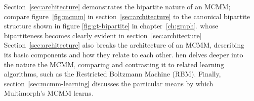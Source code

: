 Section~\ref{sec:architecture} demonstrates the bipartite nature of an MCMM; compare figure~\ref{fig:mcmm} in section~\ref{sec:architecture} to the canonical bipartite structure shown in figure \ref{fig:gt-bipartite} in chapter~\ref{ch:graph}. whose bipartiteness becomes clearly evident in section~\ref{sec:architecture} Section~\ref{sec:architecture} also breaks the architecture of an MCMM, describing its basic components and how they relate to each other. hen delves deeper into the nature the MCMM, comparing and contrasting it to related learning algorithms, such as the Restricted Boltzmann Machine (RBM). Finally, section~\ref{sec:mcmm-learning} discusses the particular means by which Multimorph's MCMM learns.

%

